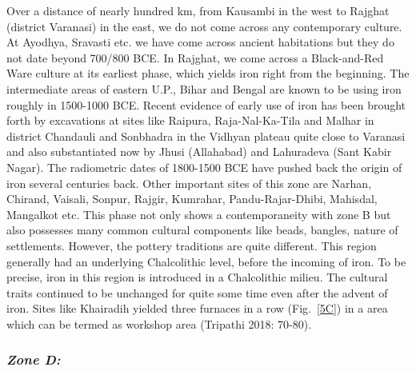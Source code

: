 Over a distance of nearly hundred km, from Kausambi in the west to Rajghat (district Varanasi) in the east, we do not come across any contemporary culture. At Ayodhya, Sravasti etc. we have come across ancient habitations but they do not date beyond 700/800 BCE. In Rajghat, we come across a Black-and-Red Ware culture at its earliest phase, which yields iron right from the beginning. The intermediate areas of eastern U.P., Bihar and Bengal are known to be using iron roughly in 1500-1000 BCE. Recent evidence of early use of iron has been brought forth by excavations at sites like Raipura, Raja-Nal-Ka-Tila and Malhar in district Chandauli and Sonbhadra in the Vidhyan plateau quite close to Varanasi and also substantiated now by Jhusi (Allahabad) and Lahuradeva (Sant Kabir Nagar). The radiometric dates of 1800-1500 BCE have pushed back the origin of iron several centuries back. Other important sites of this zone are Narhan, Chirand, Vaisali, Sonpur, Rajgir, Kumrahar, Pandu-Rajar-Dhibi, Mahisdal, Mangalkot etc. This phase not only shows a contemporaneity with zone B but also possesses many common cultural components like beads, bangles, nature of settlements. However, the pottery traditions are quite different. This region generally had an underlying Chalcolithic level, before the incoming of iron. To be precise, iron in this region is introduced in a Chalcolithic milieu. The cultural traits continued to be unchanged for quite some time even after the advent of iron. Sites like Khairadih yielded three furnaces in a row (Fig.~\ref{5C}) in a area which can be termed as workshop area (Tripathi 2018: 70-80).

\vspace{-.3cm}

\subsubsection*{\textit{Zone D:}}

\vspace{-.2cm}

